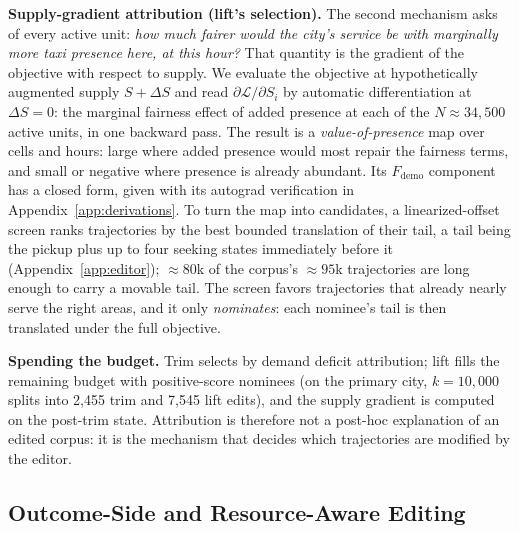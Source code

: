 \textbf{Supply-gradient attribution (lift's selection).} The second mechanism
asks of every active unit: \emph{how much fairer would the city's service be
with marginally more taxi presence here, at this hour?} That quantity is the
gradient of the objective with respect to supply. We
evaluate the objective at hypothetically augmented supply $S + \Delta S$ and
read $\partial \mathcal{L} / \partial S_i$ by automatic differentiation at
$\Delta S = 0$: the marginal fairness effect of added presence at each of the
$N \approx 34{,}500$ active units, in one backward pass. The result is a
\emph{value-of-presence} map over cells and hours: large where added presence would
most repair the fairness terms, and small or negative where presence is
already abundant. Its $F_{\mathrm{demo}}$ component has a closed form, given
with its autograd verification in Appendix~\ref{app:derivations}.
To turn the map into candidates, a linearized-offset screen ranks trajectories
by the best bounded translation of their tail, a tail being the pickup plus up
to four seeking states immediately before it (Appendix~\ref{app:editor});
${\approx}80$k of the corpus's ${\approx}95$k trajectories are long enough to
carry a movable tail. The screen favors trajectories that already nearly serve
the right areas, and it only \emph{nominates}: each nominee's tail is then
translated under the full objective.

\textbf{Spending the budget.} Trim selects by demand
deficit attribution; lift fills the remaining budget with positive-score
nominees
(on the primary city, $k = 10{,}000$ splits into 2{,}455 trim and 7{,}545 lift
edits), and the supply gradient is computed on the post-trim state.
Attribution is therefore not a post-hoc explanation of an edited corpus: it is
the mechanism that decides which trajectories are modified by the editor.

\subsection{Outcome-Side and Resource-Aware Editing}

